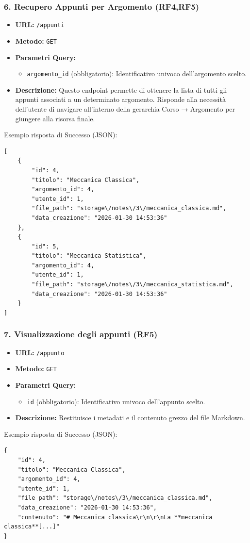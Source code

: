 \subsubsection{6. Recupero Appunti per Argomento (RF4,RF5)}
\begin{itemize}
    \item \textbf{URL:} \texttt{/appunti}
    \item \textbf{Metodo:} \texttt{GET}
    \item \textbf{Parametri Query:} 
        \begin{itemize}
            \item \texttt{argomento\_id} (obbligatorio): Identificativo univoco dell'argomento scelto.
        \end{itemize}
    \item \textbf{Descrizione:} Questo endpoint permette di ottenere la lista di tutti gli appunti associati a un determinato argomento. Risponde alla necessità dell'utente di navigare all'interno della gerarchia Corso → Argomento per giungere alla risorsa finale.
\end{itemize}
Esempio risposta di Successo (JSON):
\begin{verbatim}
[
    {
        "id": 4,
        "titolo": "Meccanica Classica",
        "argomento_id": 4,
        "utente_id": 1,
        "file_path": "storage\/notes\/3\/meccanica_classica.md",
        "data_creazione": "2026-01-30 14:53:36"
    },
    {
        "id": 5,
        "titolo": "Meccanica Statistica",
        "argomento_id": 4,
        "utente_id": 1,
        "file_path": "storage\/notes\/3\/meccanica_statistica.md",
        "data_creazione": "2026-01-30 14:53:36"
    }
]
\end{verbatim}

\subsubsection{7. Visualizzazione degli appunti (RF5)}
\begin{itemize}
    \item \textbf{URL:} \texttt{/appunto}
    \item \textbf{Metodo:} \texttt{GET}
    \item \textbf{Parametri Query:} 
        \begin{itemize}
            \item \texttt{id} (obbligatorio): Identificativo univoco dell'appunto scelto.
        \end{itemize}
    \item \textbf{Descrizione:} Restituisce i metadati e il contenuto grezzo del file Markdown.
\end{itemize}
Esempio risposta di Successo (JSON):
\begin{verbatim}
{
    "id": 4,
    "titolo": "Meccanica Classica",
    "argomento_id": 4,
    "utente_id": 1,
    "file_path": "storage\/notes\/3\/meccanica_classica.md",
    "data_creazione": "2026-01-30 14:53:36",
    "contenuto": "# Meccanica classica\r\n\r\nLa **meccanica classica**[...]"
}
\end{verbatim}

